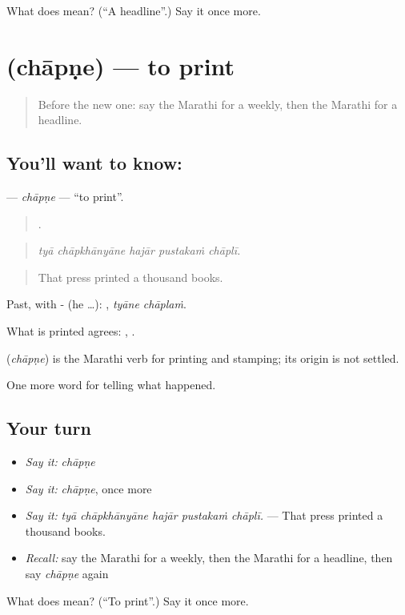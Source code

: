 \begin{tcolorbox}[breakable,colback=teal!4,colframe=teal!35!black,title={Before you move on}]
What does  mean? (\textquotedblleft{}A headline\textquotedblright{}.) Say it once more.
\end{tcolorbox}
\section[\texorpdfstring{\mr{छापणे} (chāpṇe)}{छापणे (chāpṇe)}]{ (chāpṇe) — to print}

\label{lesson:MR-C310-chapne}



\begin{quote}
Before the new one: say the Marathi for a weekly, then the Marathi for a headline.
\end{quote}

\subsection*{You'll want to know: }
\textbf{} — \emph{chāpṇe} — \textquotedblleft{}to print\textquotedblright{}.

\begin{quote}
    .
\end{quote}

\begin{quote}
\emph{tyā chāpkhānyāne hajār pustakaṁ chāplī.}
\end{quote}

\begin{quote}
That press printed a thousand books.
\end{quote}

Past, with - (he …):  , \emph{tyāne chāplaṁ}.

What is printed agrees:  ,  .

\begin{cousinweb}
\textbf{} (\emph{chāpṇe}) is the Marathi verb for printing and stamping; its origin is not settled.
\end{cousinweb}

\begin{grammarlens}[title={What you've built}]
One more word for telling what happened.
\end{grammarlens}

\subsection*{Your turn}
\begin{itemize}
\raggedright
  \item \emph{Say it:} \emph{chāpṇe}
  \item \emph{Say it:} \emph{chāpṇe}, once more
  \item \emph{Say it:} \emph{tyā chāpkhānyāne hajār pustakaṁ chāplī.} — That press printed a thousand books.
  \item \emph{Recall:} say the Marathi for a weekly, then the Marathi for a headline, then say \emph{chāpṇe} again
\end{itemize}

\begin{tcolorbox}[breakable,colback=teal!4,colframe=teal!35!black,title={Before you move on}]
What does  mean? (\textquotedblleft{}To print\textquotedblright{}.) Say it once more.
\end{tcolorbox}
